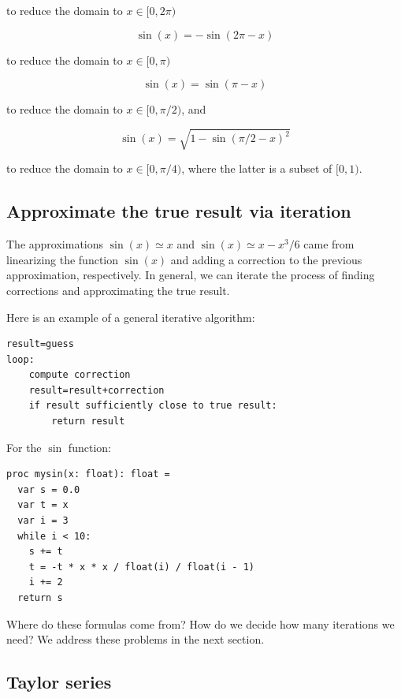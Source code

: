 \documentclass[justified, sixbynine]{tufte-book}
\theoremstyle{plain}%
\newtheorem * {corollary}{Corollary}
\theoremstyle{definition}
\theoremstyle{remark}
\newtheorem * {remark}{Remark}
\newtheorem * {note}{Note}
\begin{document}
\begin{fullwidth}
to reduce the domain to $x \in [0, 2\pi)$

\begin{equation}
\sin(x) = -\sin(2\pi - x)
\end{equation}

to reduce the domain to $x \in [0, \pi)$

\begin{equation}
\sin(x) = \sin(\pi - x)
\end{equation}

to reduce the domain to $x \in [0, \pi/2)$, and

\begin{equation}
\sin(x) = \sqrt{1 - \sin(\pi/2 - x)^2}
\end{equation}

to reduce the domain to $x \in [0, \pi/4)$, where the latter is a subset of $[0, 1)$.

\goodbreak\subsection{Approximate the true result via iteration}


The approximations $\sin(x) \simeq x$ and $\sin(x) \simeq x - x^3/6$ came from linearizing the function $\sin(x)$ and adding a correction to the previous approximation, respectively. In general, we can iterate the process of finding corrections and approximating the true result.

Here is an example of a general iterative algorithm:
\begin{lstlisting}
result=guess
loop:
    compute correction
    result=result+correction
    if result sufficiently close to true result:
        return result
\end{lstlisting}

For the $\sin$ function:

\begin{lstlisting}
proc mysin(x: float): float =
  var s = 0.0
  var t = x
  var i = 3
  while i < 10:
    s += t
    t = -t * x * x / float(i) / float(i - 1)
    i += 2
  return s
\end{lstlisting}

Where do these formulas come from? How do we decide how many iterations we need? We address these problems in the next section.


\goodbreak\subsection{Taylor series}


\end{fullwidth}
\end{document}
